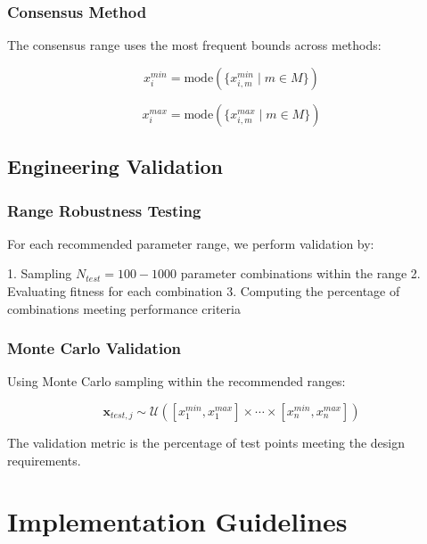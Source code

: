 \documentclass[../main.tex]{subfiles}
\begin{document}
\subsubsection{Consensus Method}

The consensus range uses the most frequent bounds across methods:

\begin{equation}
x_i^{min} = \text{mode}(\{x_{i,m}^{min} \mid m \in M\})
\label{eq:consensus_min}
\end{equation}

\begin{equation}
x_i^{max} = \text{mode}(\{x_{i,m}^{max} \mid m \in M\})
\label{eq:consensus_max}
\end{equation}

\subsection{Engineering Validation}

\subsubsection{Range Robustness Testing}

For each recommended parameter range, we perform validation by:

1. Sampling $N_{test} = 100-1000$ parameter combinations within the range
2. Evaluating fitness for each combination
3. Computing the percentage of combinations meeting performance criteria

\subsubsection{Monte Carlo Validation}

Using Monte Carlo sampling within the recommended ranges:

\begin{equation}
\mathbf{x}_{test,j} \sim \mathcal{U}([x_1^{min}, x_1^{max}] \times \cdots \times [x_n^{min}, x_n^{max}])
\label{eq:monte_carlo}
\end{equation}

The validation metric is the percentage of test points meeting the design requirements.

\section{Implementation Guidelines}
\end{document}

